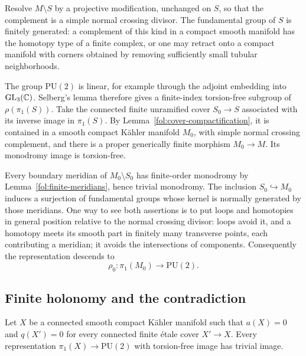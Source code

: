 Resolve $M\setminus S$ by a projective modification, unchanged on $S$,
so that the complement is a simple normal crossing divisor.
The fundamental group of $S$ is finitely generated: a complement of
this kind in a compact smooth manifold has the homotopy type of a
finite complex, or one may retract onto a compact manifold with
corners obtained by removing sufficiently small tubular neighborhoods.

The group $\mathrm{PU}(2)$ is linear, for example through the adjoint
embedding into $\mathrm{GL}_3(\mathbb{C})$.  Selberg's lemma therefore gives
a finite-index torsion-free subgroup of $\rho(\pi_1(S))$.
Take the connected finite unramified cover $S_0\to S$ associated with
its inverse image in $\pi_1(S)$.  By
Lemma~\ref{fol:cover-compactification}, it is contained in a smooth
compact K\"ahler manifold $M_0$, with simple normal crossing
complement, and there is a proper generically finite morphism
$M_0\to M$.  Its monodromy image is torsion-free.

Every boundary meridian of $M_0\setminus S_0$ has finite-order
monodromy by Lemma~\ref{fol:finite-meridians}, hence trivial
monodromy.  The inclusion $S_0\hookrightarrow M_0$ induces a
surjection of fundamental groups whose kernel is normally generated
by those meridians.  One way to see both assertions is to put loops
and homotopies in general position relative to the normal crossing
divisor: loops avoid it, and a homotopy meets its smooth part in
finitely many transverse points, each contributing a meridian; it
avoids the intersections of components.  Consequently the
representation descends to
\begin{equation}\label{fol:compact-representation}
 \rho_0\colon\pi_1(M_0)\to\mathrm{PU}(2).
\end{equation}

\subsection{Finite holonomy and the contradiction}

\begin{lemma}\label{fol:finite-unitary-image}
Let $X$ be a connected smooth compact K\"ahler manifold such that
$a(X)=0$ and $q(X')=0$ for every connected finite \'etale cover
$X'\to X$.  Every representation
$\pi_1(X)\to\mathrm{PU}(2)$ with torsion-free image has trivial image.
\end{lemma}

